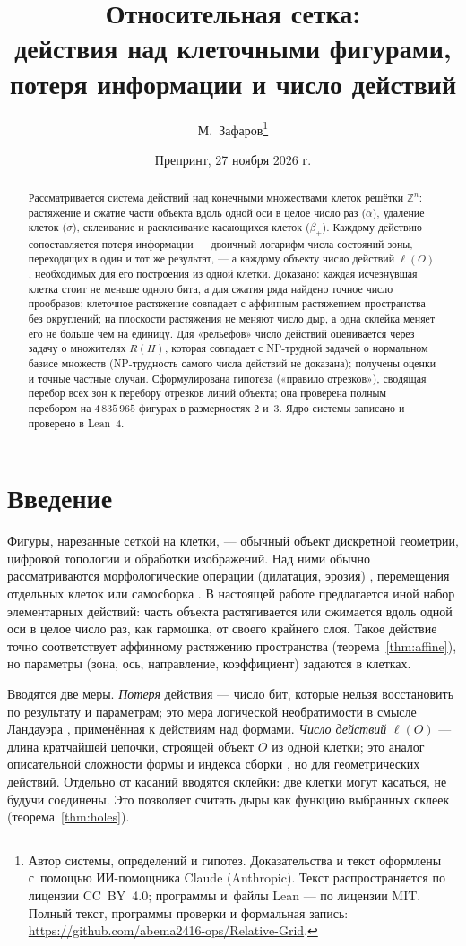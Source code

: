 \documentclass[11pt,a4paper]{article}
\title{\textbf{Относительная сетка:\\ действия над клеточными фигурами,\\ потеря информации и число действий}}
\author{М.~Зафаров\thanks{Автор системы, определений и гипотез. Доказательства и текст оформлены с~помощью ИИ-помощника Claude (Anthropic). Текст распространяется по лицензии CC~BY~4.0; программы и~файлы Lean — по лицензии MIT. Полный текст, программы проверки и формальная запись: \url{https://github.com/abema2416-ops/Relative-Grid}.}}
\date{Препринт, 27 ноября 2026 г.}
\theoremstyle{plain}
\theoremstyle{definition}
\theoremstyle{remark}
\newcommand{\Z}{\mathbb{Z}}
\begin{document}
\maketitle

\begin{abstract}
Рассматривается система действий над конечными множествами клеток решётки $\Z^n$: растяжение и сжатие части объекта вдоль одной оси в целое число раз ($\alpha$), удаление клеток ($\sigma$), склеивание и расклеивание касающихся клеток ($\beta_\pm$). Каждому действию сопоставляется потеря информации — двоичный логарифм числа состояний зоны, переходящих в один и тот же результат, — а каждому объекту число действий $\ell(O)$, необходимых для его построения из одной клетки. Доказано: каждая исчезнувшая клетка стоит не меньше одного бита, а для сжатия ряда найдено точное число прообразов; клеточное растяжение совпадает с аффинным растяжением пространства без округлений; на плоскости растяжения не меняют число дыр, а одна склейка меняет его не больше чем на единицу. Для «рельефов» число действий оценивается через задачу о множителях $R(H)$, которая совпадает с NP-трудной задачей о нормальном базисе множеств (NP-трудность самого числа действий не доказана); получены оценки и точные частные случаи. Сформулирована гипотеза («правило отрезков»), сводящая перебор всех зон к перебору отрезков линий объекта; она проверена полным перебором на $4\,835\,965$ фигурах в размерностях 2 и~3. Ядро системы записано и проверено в Lean~4.
\end{abstract}

\section{Введение}

Фигуры, нарезанные сеткой на клетки, — обычный объект дискретной геометрии, цифровой топологии и обработки изображений. Над ними обычно рассматриваются морфологические операции (дилатация, эрозия) \cite{serra}, перемещения отдельных клеток \cite{akitaya} или самосборка \cite{soloveichik}. В настоящей работе предлагается иной набор элементарных действий: часть объекта растягивается или сжимается вдоль одной оси в целое число раз, как гармошка, от своего крайнего слоя. Такое действие точно соответствует аффинному растяжению пространства (теорема~\ref{thm:affine}), но параметры (зона, ось, направление, коэффициент) задаются в клетках.

Вводятся две меры.
\emph{Потеря} действия — число бит, которые нельзя восстановить по результату и параметрам; это мера логической необратимости в смысле Ландауэра \cite{landauer}, применённая к действиям над формами.
\emph{Число действий} $\ell(O)$ — длина кратчайшей цепочки, строящей объект $O$ из одной клетки; это аналог описательной сложности формы \cite{soloveichik} и индекса сборки \cite{assembly}, но для геометрических действий.
Отдельно от касаний вводятся склейки: две клетки могут касаться, не будучи соединены. Это позволяет считать дыры как функцию выбранных склеек (теорема~\ref{thm:holes}).
\end{document}
